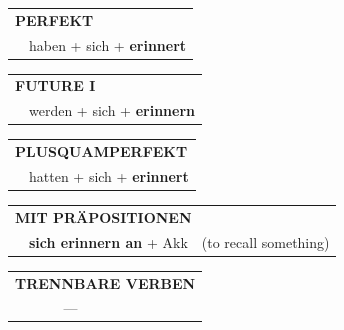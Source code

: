 \documentclass[10pt,a4paper]{revtex4-2}
\begin{document}
\begin{verbbox}
 \begin{tabular}{rl}
     \multicolumn{2}{l}{\textbf{PERFEKT}}\\
    &haben + sich + \textbf{erinnert}\\
  \end{tabular}
\hfill
   \begin{tabular}{rl}
   
    \multicolumn{2}{l}{\textbf{FUTURE I} }\\
    &werden + sich + \textbf{erinnern}\\
 
  \end{tabular}
\hfill
   \begin{tabular}{rl}
      \multicolumn{2}{l}{\textbf{PLUSQUAMPERFEKT}}\\
    &hatten + sich + \textbf{erinnert}\\
  \end{tabular}
  
\vspace{10pt}

   \begin{tabular}{lll}
      \multicolumn{3}{l}{\textbf{MIT PRÄPOSITIONEN}}\\
& \textbf{sich erinnern an} + Akk & (to recall something)
  \end{tabular}
  \hfill
   \begin{tabular}{lll}
      \multicolumn{3}{l}{\textbf{TRENNBARE VERBEN}}\\
& --- & \\
 \end{tabular}
  
  \vspace{-5pt}

\end{verbbox}
\end{document}

